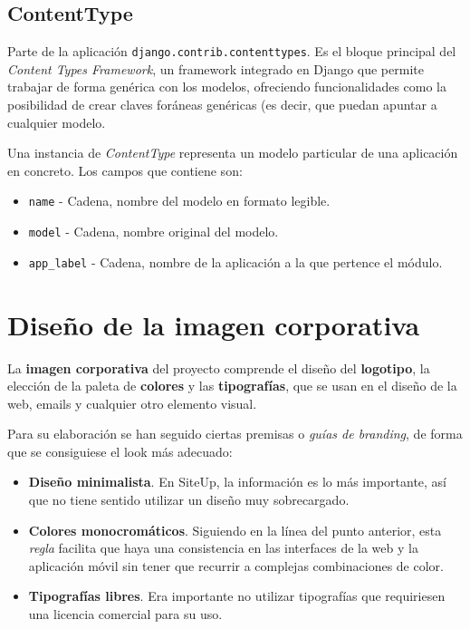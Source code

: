 \subsection{ContentType}

Parte de la aplicación \texttt{django.contrib.contenttypes}. Es el bloque
principal del \textit{Content Types Framework}, un framework integrado en Django
que permite trabajar de forma genérica con los modelos, ofreciendo
funcionalidades como la posibilidad de crear claves foráneas genéricas (es
decir, que puedan apuntar a cualquier modelo. 

Una instancia de \textit{ContentType} representa un modelo particular de una
aplicación en concreto. Los campos que contiene son:

\begin{itemize}
\item \texttt{name} - Cadena, nombre del modelo en formato legible.
\item \texttt{model} - Cadena, nombre original del modelo.
\item \texttt{app\_label} - Cadena, nombre de la aplicación a la que pertence el
  módulo.
\end{itemize}

\section{Diseño de la imagen corporativa}

La \textbf{imagen corporativa} del proyecto comprende el diseño del
\textbf{logotipo}, la elección de la paleta de \textbf{colores} y las
\textbf{tipografías}, que se usan en el diseño de la web, emails y cualquier
otro elemento visual.

Para su elaboración se han seguido ciertas premisas o \textit{guías de
  branding}, de forma que se consiguiese el look más adecuado:

\begin{itemize}
\item \textbf{Diseño minimalista}. En SiteUp, la información es lo más
  importante, así que no tiene sentido utilizar un diseño muy sobrecargado.
\item \textbf{Colores monocromáticos}. Siguiendo en la línea del punto anterior,
  esta \textit{regla} facilita que haya una consistencia en las interfaces de la
  web y la aplicación móvil sin tener que recurrir a complejas combinaciones de
  color.
\item \textbf{Tipografías libres}. Era importante no utilizar tipografías que
  requiriesen una licencia comercial para su uso.
\end{itemize}

